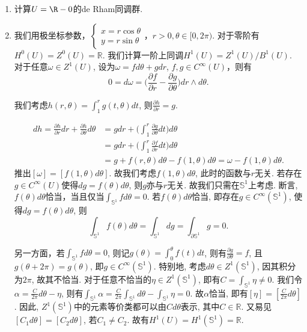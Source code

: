 \begin{enumerate}
    \item[1.4.1] 计算$U=\R-0$的de Rham同调群.
    \item[\textbf{解：}]

        \qquad 我们用极坐标参数，$\begin{cases}
                    x=r\cos \theta\\
                    y=r\sin \theta
                \end{cases}$，$r>0, \theta\in [0,2\pi)$.
        对于零阶有$H^0(U)=Z^0(U)=\mathbb{R}$.
        我们计算一阶上同调$H^1(U)=Z^1(U)/B^1(U)$. 对于任意$\omega\in Z^1(U)$, 
        设为$\omega=fd\theta+gdr$, $f,g\in C^\infty(U)$，则有
        $$0=d\omega=\bigg(\frac{\partial f}{\partial r}
        -\frac{\partial g}{\partial \theta}\bigg)dr\wedge d\theta.$$
        
        \qquad 我们考虑$h(r,\theta)=\int_1^r g(t,\theta)dt$, 
        则$\frac{\partial h}{\partial r}=g$.
            
        \begin{align*}
           dh=\frac{\partial h}{\partial r}dr+\frac{\partial h}{\partial \theta}d\theta
           &=gdr+\bigg(\int_1^r \frac{\partial g}{\partial \theta}dt\bigg)d\theta\\
           &=gdr+\bigg(\int_1^r\frac{\partial f}{\partial r}dt\bigg)d\theta\\
           &=g+f(r,\theta)d\theta-f(1,\theta)d\theta=\omega-f(1,\theta)d\theta.
        \end{align*}
        推出$[\omega]=[f(1,\theta)d\theta]$.
        故我们考虑$f(1,\theta)d\theta$, 此时的函数与$r$无关. 
        若存在$g\in C^\infty(U)$使得$dg=f(\theta)d\theta$, 则$g$亦与$r$无关. 
        故我们只需在$\mathbb{S}^1$上考虑.
        断言, $f(\theta)d\theta$恰当，当且仅当$\int_{\mathbb{S}^1}fd\theta=0$.
        若$f(\theta)d\theta$恰当, 即存在$g\in C^\infty(\mathbb{S}^1)$, 
        使得$dg=f(\theta)d\theta$, 则
        $$\int_{\mathbb{S}^1}f(\theta)d\theta=\int_{\mathbb{S}^1}dg
        =\int_{\partial \mathbb{S}^1}g=0.$$
            
        另一方面，若$\int_{\mathbb{S}^1} fd\theta=0$, 
        则记$g(\theta)=\int_0^\theta f(t)dt$, 
        则有$\frac{\partial g}{\partial \theta}=f$, 
        且$g(\theta+2\pi)=g(\theta)$, 即$g\in C^\infty(\mathbb{S}^1)$.
        特别地, 考虑$d\theta\in Z^1(\mathbb{S}^1)$, 因其积分为$2\pi$, 故其不恰当.
        对于任意不恰当的$\eta\in Z^1(\mathbb{S}^1)$, 
        即有$C=\int_{\mathbb{S}^1} \eta\neq 0$. 
        我们令$\alpha=\frac{C}{2\pi}d\theta-\eta$, 
        则有$\int_{\mathbb{S}^1} \alpha
        =\frac{C}{2\pi}\int_{\mathbb{S}^1}d\theta-\int_{\mathbb{S}^1}\eta=0$.
        故$\alpha$恰当, 即有$[\eta]=[\frac{C}{2\pi}d\theta]$.
        因此, $Z^1(\mathbb{S}^1)$中的元素等价类都可以由$Cd\theta$表示, 
        其中$C\in \mathbb{R}$. 又易见$[C_1d\theta]=[C_2d\theta]$, 若$C_1\neq C_2$. 
        故有$H^1(U)=H^1(\mathbb{S}^1)=\mathbb{R}$.


\end{enumerate}
